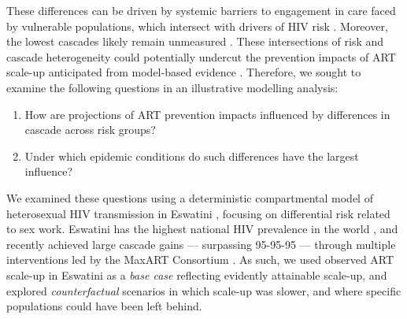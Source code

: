 These differences can be driven by
systemic barriers to engagement in care faced by vulnerable populations, %
which intersect with drivers of HIV risk \cite{Wanyenze2016,Schwartz2017,Schmidt-Sane2022}. %
Moreover, the lowest cascades likely remain unmeasured \cite{Hakim2018,Boothe2021}. 
These intersections of risk and cascade heterogeneity  %
could potentially undercut the prevention impacts of ART scale-up
anticipated from model-based evidence \cite{Baral2019}.
Therefore, we sought to examine the following questions
in an illustrative modelling analysis:
\begin{enumerate}
  \item\label{obj:art.1} How are projections of ART prevention impacts
    influenced by differences in cascade across risk groups?
  \item\label{obj:art.2} Under which epidemic conditions
    do such differences have the largest influence?
\end{enumerate}
We examined these questions using
a deterministic compartmental model of heterosexual HIV transmission in Eswatini \cite{Knight2019},
focusing on differential risk related to sex work.
Eswatini has the highest national HIV prevalence in the world \cite{UNAIDS2021}, %
and recently achieved large cascade gains --- surpassing 95-95-95 ---
through multiple interventions led by the MaxART Consortium \cite{Walsh2020,SHIMS3,AIDSinfo}.
As such, we used observed ART scale-up in Eswatini as a \emph{base case}
reflecting evidently attainable scale-up,
and explored \emph{counterfactual} scenarios in which scale-up was slower,
and where specific populations could have been left behind. %
